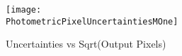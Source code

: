 \begin{figure*}[h!]
  \centering
  \texttt{[image: \\PhotometricPixelUncertaintiesMOne]}
  \caption{Uncertainties vs Sqrt(Output Pixels)}
\end{figure*}

%

%
%
%
%
%
%

